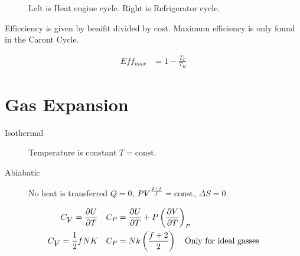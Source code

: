 \documentclass[10pt]{article}
\newcommand{\V}{{\ooalign{\hfil$V$\hfil\cr\kern0.08em--\hfil\cr}}}
\begin{document}
\begin{figure}[htpb]
  \centering
  \begin{minipage}{.4\linewidth}
  \end{minipage}
  \begin{minipage}{.4\linewidth}
  \end{minipage}
  \caption{Left is Heat engine cycle. Right is Refrigerator cycle.}
\end{figure}

Efficciency is given by benifit divided by cost. Maximum efficiency is only
found in the Caront Cycle.

\begin{align}
  Eff_{max}&=1-\frac{T_C}{T_H}
\end{align}

\section{Gas Expansion}%
\label{sec:gas_expansion}

\begin{description}
  \item[Isothermal] Temperature is constant $T=\text{const}$.
  \item[Abiabatic] No heat is transferred $Q=0$,
    $P\V^{\frac{2+f}{f}}=\text{const}$, $\Delta S =0$.
\end{description}

\begin{align}
  C_\V=\frac{\partial U}{\partial T}&\quad C_P=\frac{\partial U}{\partial
    T}+P\left(\frac{\partial \V}{\partial T}\right)_P\\
  C_\V=\frac{1}{2}fNK&\quad C_P=Nk\left(\frac{f+2}{2}\right)\quad\text{Only for
  ideal gasses}
\end{align}
\end{document}
